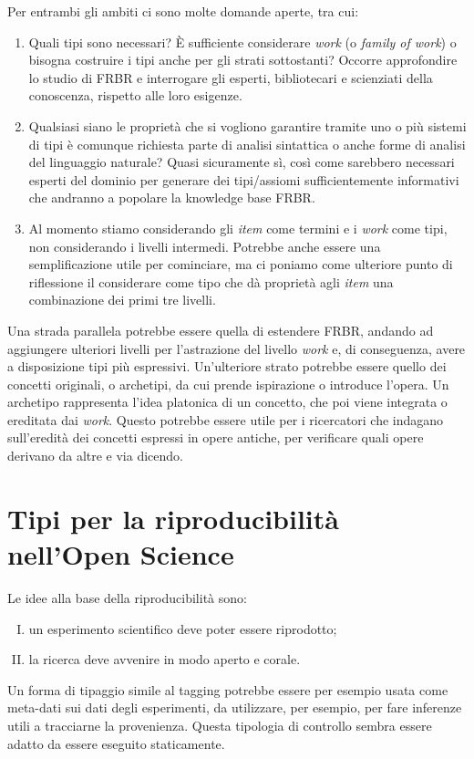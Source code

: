 Per entrambi gli ambiti ci sono molte domande aperte, tra cui:
\begin{enumerate}
	\item Quali tipi sono necessari? È sufficiente considerare \emph{work} (o \emph{family of work}) o bisogna costruire i tipi anche per gli strati sottostanti? Occorre 
	approfondire lo studio di FRBR e interrogare gli esperti, bibliotecari e scienziati della conoscenza, rispetto alle loro esigenze.
	\item Qualsiasi siano le proprietà che si vogliono garantire tramite uno o più sistemi di tipi è comunque richiesta parte di analisi sintattica o anche 
	forme di analisi del linguaggio naturale? Quasi sicuramente sì, così come sarebbero necessari esperti del dominio per generare dei tipi/assiomi 
	sufficientemente informativi che andranno a popolare la knowledge base FRBR.
	\item Al momento stiamo considerando gli \emph{item} come termini e i \emph{work} come tipi, non considerando i livelli intermedi. Potrebbe anche essere una 
	semplificazione utile per cominciare, ma ci poniamo come ulteriore punto di riflessione il considerare come tipo che dà proprietà agli \emph{item} una 
	combinazione dei primi tre livelli.
\end{enumerate}
\noindent
Una strada parallela potrebbe essere quella di estendere FRBR, andando ad aggiungere ulteriori livelli per l'astrazione del livello \emph{work} e, di conseguenza, 
avere a disposizione tipi più espressivi. Un'ulteriore strato potrebbe essere quello dei concetti originali, o archetipi, da cui prende ispirazione o introduce l'opera. Un archetipo rappresenta l'idea platonica di un concetto, che poi viene integrata o ereditata dai \emph{work}. Questo potrebbe essere utile 
per i ricercatori che indagano sull'eredità dei concetti espressi in opere antiche, per verificare quali opere derivano da altre e via dicendo.

\section{Tipi per la riproducibilità nell'Open Science}
Le idee alla base della riproducibilità sono: 
\begin{enumerate}[I)]
	\item un esperimento scientifico deve poter essere riprodotto; 
	\item la ricerca deve avvenire in modo aperto e corale. 
\end{enumerate}
Un forma di tipaggio simile al tagging potrebbe essere per esempio usata come meta-dati sui dati degli esperimenti, da utilizzare, per esempio, per 
fare inferenze utili a tracciarne la provenienza. Questa tipologia di controllo sembra essere adatto da essere eseguito staticamente.